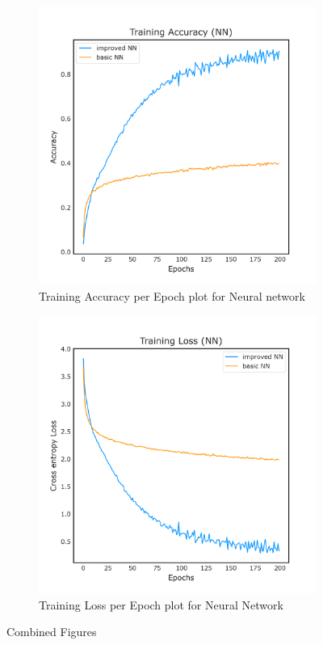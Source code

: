 \begin{figure}[h]
    \begin{subfigure}{0.5\textwidth}
        \centering
        \includegraphics[width=\linewidth]{figs/train_accuracy.png}
        \caption{Training Accuracy per Epoch plot for Neural network}
        \label{fig:accuracy}
    \end{subfigure}%
    \begin{subfigure}{0.5\textwidth}
        \centering
        \includegraphics[width=\linewidth]{figs/train_loss1.png}
        \caption{Training Loss per Epoch plot for Neural Network}
        \label{fig:loss}
    \end{subfigure}
    \caption{Combined Figures}
    \label{fig:combined}
\end{figure}

